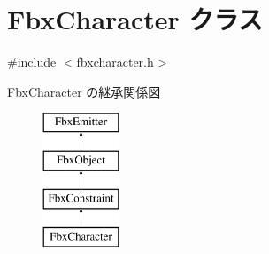 \hypertarget{class_fbx_character}{}\section{Fbx\+Character クラス}
\label{class_fbx_character}


{\ttfamily \#include $<$fbxcharacter.\+h$>$}

Fbx\+Character の継承関係図\begin{figure}[H]
\begin{center}
\leavevmode
\includegraphics[height=4.000000cm]{class_fbx_character}
\end{center}
\end{figure}
